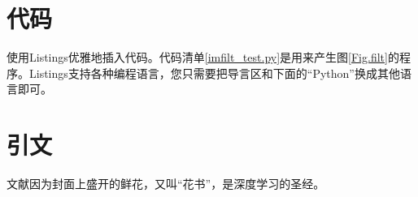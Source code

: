\documentclass[a4paper, 12pt, centering, AutoFakeBold]{article}
\begin{document}
\section{代码}
使用Listings优雅地插入代码。代码清单\ref{imfilt_test.py}是用来产生图\ref{Fig.filt}的程序。Listings支持各种编程语言，您只需要把导言区和下面的“Python”换成其他语言即可。


\section{引文}
文献\cite{Goodfellow-et-al-2016}因为封面上盛开的鲜花，又叫“花书”，是深度学习的圣经。



\end{document}
